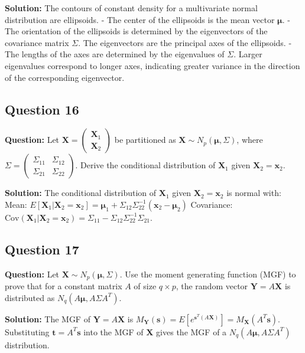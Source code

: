 \textbf{Solution:}
The contours of constant density for a multivariate normal distribution are ellipsoids.
- The center of the ellipsoids is the mean vector $\boldsymbol{\mu}$.
- The orientation of the ellipsoids is determined by the eigenvectors of the covariance matrix $\Sigma$. The eigenvectors are the principal axes of the ellipsoids.
- The lengths of the axes are determined by the eigenvalues of $\Sigma$. Larger eigenvalues correspond to longer axes, indicating greater variance in the direction of the corresponding eigenvector.

\subsection*{Question 16}
\textbf{Question:} Let $\mathbf{X} = \begin{pmatrix} \mathbf{X}_1 \\ \mathbf{X}_2 \end{pmatrix}$ be partitioned as $\mathbf{X} \sim N_p(\boldsymbol{\mu}, \Sigma)$, where $\Sigma = \begin{pmatrix} \Sigma_{11} & \Sigma_{12} \\ \Sigma_{21} & \Sigma_{22} \end{pmatrix}$. Derive the conditional distribution of $\mathbf{X}_1$ given $\mathbf{X}_2 = \mathbf{x}_2$.

\textbf{Solution:}
The conditional distribution of $\mathbf{X}_1$ given $\mathbf{X}_2=\mathbf{x}_2$ is normal with:
Mean: $E[\mathbf{X}_1 | \mathbf{X}_2=\mathbf{x}_2] = \boldsymbol{\mu}_1 + \Sigma_{12}\Sigma_{22}^{-1}(\mathbf{x}_2 - \boldsymbol{\mu}_2)$
Covariance: $\text{Cov}(\mathbf{X}_1 | \mathbf{X}_2=\mathbf{x}_2) = \Sigma_{11} - \Sigma_{12}\Sigma_{22}^{-1}\Sigma_{21}$.

\subsection*{Question 17}
\textbf{Question:} Let $\mathbf{X} \sim N_p(\boldsymbol{\mu}, \Sigma)$. Use the moment generating function (MGF) to prove that for a constant matrix $A$ of size $q \times p$, the random vector $\mathbf{Y} = A\mathbf{X}$ is distributed as $N_q(A\boldsymbol{\mu}, A\Sigma A^T)$.

\textbf{Solution:}
The MGF of $\mathbf{Y} = A\mathbf{X}$ is $M_{\mathbf{Y}}(\mathbf{s}) = E[e^{\mathbf{s}^T(A\mathbf{X})}] = M_{\mathbf{X}}(A^T\mathbf{s})$.
Substituting $\mathbf{t} = A^T\mathbf{s}$ into the MGF of $\mathbf{X}$ gives the MGF of a $N_q(A\boldsymbol{\mu}, A\Sigma A^T)$ distribution.

